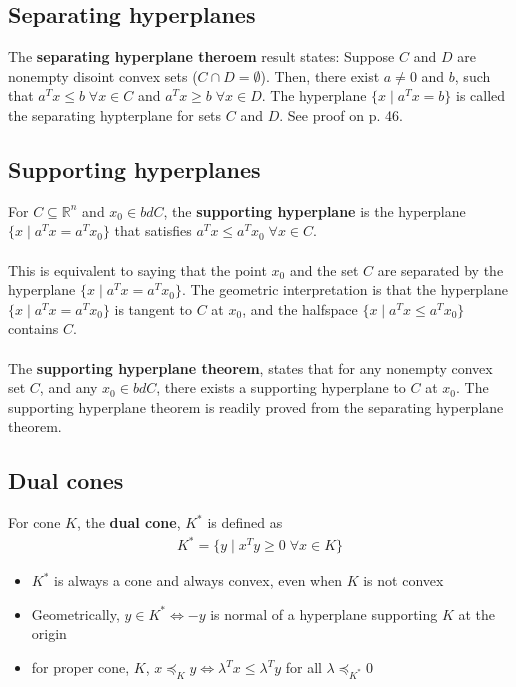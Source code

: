 \documentclass{article}
\begin{document}
\subsection{Separating hyperplanes}
The \textbf{separating hyperplane theroem} result states: Suppose $C$ and $D$ are nonempty disoint convex sets ($C \cap D = \emptyset$). Then, there exist $a \neq 0$ and $b$, such that $a^Tx \leq b \; \forall x \in C$ and $a^Tx \geq b \; \forall x \in D$. The hyperplane $\{x \mid a^Tx = b\}$ is called the separating hypterplane for sets $C$ and $D$. See proof on p. 46.

\subsection{Supporting hyperplanes}
For $C \subseteq \mathbb{R}^n$ and $x_0 \in bd C$, the \textbf{supporting hyperplane} is the hyperplane $\{x \mid a^Tx = a^Tx_0\}$ that satisfies $a^Tx \leq a^Tx_0 \; \forall x \in C$.\\\\
This is equivalent to saying that the point $x_0$ and the set $C$ are separated by the hyperplane $\{x \mid a^Tx = a^Tx_0\}$. The geometric interpretation is that the hyperplane $\{x \mid a^Tx = a^Tx_0\}$ is tangent to $C$ at $x_0$, and the halfspace $\{x \mid a^Tx \leq a^Tx_0\}$ contains $C$.\\\\
The \textbf{supporting hyperplane theorem}, states that for any nonempty convex set $C$, and any $x_0 \in bd C$, there exists a supporting hyperplane to $C$ at $x_0$. The supporting hyperplane theorem is readily proved from the separating hyperplane theorem.

\subsection{Dual cones}
For cone $K$, the \textbf{dual cone}, $K^*$ is defined as
\begin{align*}
  K^* = \{y \mid x^Ty \geq 0 \; \forall x \in K\}
\end{align*}
\begin{itemize}
  \item $K^*$ is always a cone and always convex, even when $K$ is not convex
  \item Geometrically, $y \in K^* \Longleftrightarrow -y$ is normal of a hyperplane supporting $K$ at the origin
  \item for proper cone, $K$, $x \preceq_K y \Longleftrightarrow \lambda^Tx \leq \lambda^Ty$ for all $\lambda \preceq_{K^*} 0$
\end{itemize}
\end{document}
